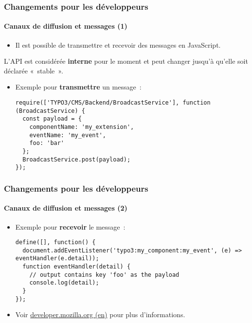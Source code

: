 \begin{frame}[fragile]
	\frametitle{Changements pour les développeurs}
	\framesubtitle{Canaux de diffusion et messages (1)}

	\lstset{basicstyle=\tiny\ttfamily}

	\begin{itemize}
		\item Il est possible de transmettre et recevoir des messages en JavaScript.
	\end{itemize}

	\vspace{-0.2cm}
	\begingroup
		\color{red}
			\begin{center}
				L'API est considérée \textbf{interne} pour le moment\newline
				et peut changer jusqu'à qu'elle soit déclarée «~stable~».
			\end{center}
	\endgroup

	\begin{itemize}
		\item Exemple pour \textbf{transmettre} un message~:

\begin{lstlisting}
require(['TYPO3/CMS/Backend/BroadcastService'], function (BroadcastService) {
  const payload = {
    componentName: 'my_extension',
    eventName: 'my_event',
    foo: 'bar'
  };
  BroadcastService.post(payload);
});
\end{lstlisting}

	\end{itemize}

\end{frame}


\begin{frame}[fragile]
	\frametitle{Changements pour les développeurs}
	\framesubtitle{Canaux de diffusion et messages (2)}

	\lstset{basicstyle=\tiny\ttfamily}

	\begin{itemize}
		\item Exemple pour \textbf{recevoir} le message~:

\begin{lstlisting}
define([], function() {
  document.addEventListener('typo3:my_component:my_event', (e) => eventHandler(e.detail));
  function eventHandler(detail) {
    // output contains key 'foo' as the payload
    console.log(detail);
  }
});
\end{lstlisting}

		\item Voir \href{https://developer.mozilla.org/en-US/docs/Web/API/Broadcast_Channel_API}{developer.mozilla.org (en)}
			pour plus d'informations.

	\end{itemize}

\end{frame}

